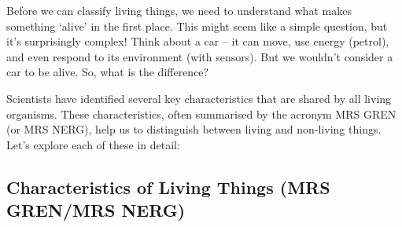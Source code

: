 \FloatBarrier
\1

Before we can classify living things, we need to understand what makes something ‘alive’ in the first place.  This might seem like a simple question, but it's surprisingly complex!  Think about a car – it can move, use energy (petrol), and even respond to its environment (with sensors).  But we wouldn’t consider a car to be alive.  So, what is the difference?

Scientists have identified several key characteristics that are shared by all living organisms. These characteristics, often summarised by the acronym MRS GREN (or MRS NERG), help us to distinguish between living and non-living things. Let's explore each of these in detail:

\subsection{Characteristics of Living Things (MRS GREN/MRS NERG)}


